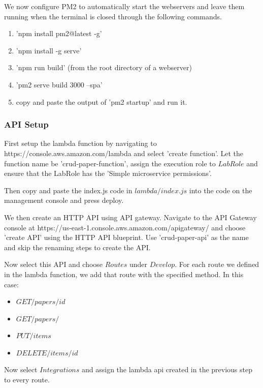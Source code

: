 \documentclass[12pt]{article}
\begin{document}
We now configure PM2 to automatically start the webservers and leave them running when the terminal is closed through the following commands.

\begin{enumerate}
    \item 'npm install pm2@latest -g'
    \item 'npm install -g serve'
    \item 'npm run build' (from the root directory of a webserver)
    \item 'pm2 serve build 3000 --spa'
    \item copy and paste the output of 'pm2 startup' and run it.

\end{enumerate}
    
\subsubsection{API Setup}

First setup the lambda function by navigating to https://console.aws.amazon.com/lambda and select 'create function'. Let the function name be 'crud-paper-function', assign the execution role to $LabRole$ and ensure that the LabRole has the 'Simple microservice permissions'.

Then copy and paste the index.js code in $lambda/index.js$ into the code on the management console and press deploy.

We then create an HTTP API using API gateway. Navigate to the API Gateway console at https://us-east-1.console.aws.amazon.com/apigateway/ and choose 'create API' using the HTTP API blueprint. Use 'crud-paper-api' as the name and skip the renaming steps to create the API. 

Now select this API and choose $Routes$ under $Develop$. For each route we defined in the lambda function, we add that route with the specified method. In this case: 

\begin{itemize}
    \item $GET /papers/{id} $
    \item $GET /papers/$
    \item $PUT /items$
    \item $DELETE /items/{id}$
\end{itemize}

Now select $Integrations$ and assign the lambda api created in the previous step to every route.
\end{document}
